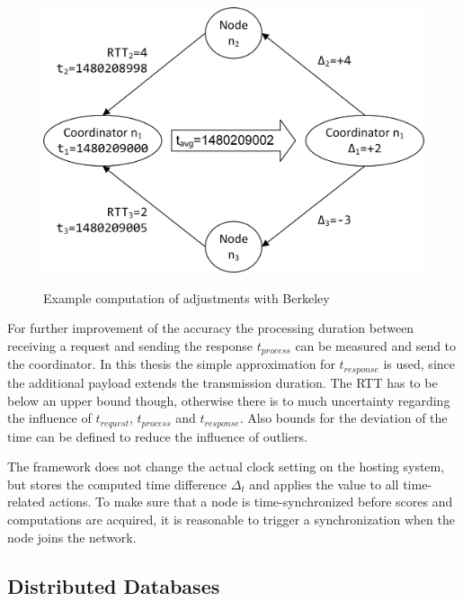 		\begin{figure}[!htbp] %
			\caption{Example computation of adjustments with Berkeley}
			\includegraphics[scale=1.0]{figures/berkeley-example.png}
			\label{figure:berkeley example}
		\end{figure}
	
		 For further improvement of the accuracy the processing duration between receiving a request and sending the response $t_{process}$ can be measured and send to the coordinator. In this thesis the simple approximation for $t_{response}$ is used, since the additional payload extends the transmission duration. The \gls{RTT} has to be below an upper bound though, otherwise there is to much uncertainty regarding the influence of $t_{request}$, $t_{process}$ and $t_{response}$.
		 Also bounds for the deviation of the time can be defined to reduce the influence of outliers.
		 
		 The framework does not change the actual clock setting on the hosting system, but stores the computed time difference $\Delta_t$ and applies the value to all time-related actions. To make sure that a node is time-synchronized before scores and computations are acquired, it is reasonable to trigger a synchronization when the node joins the network. 
		 
		\FloatBarrier
		
		\subsection{Distributed Databases}
		\label{Distributed Database}
		
		
